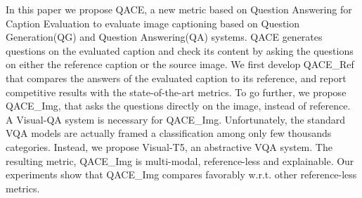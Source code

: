 In this paper we propose QACE, a new metric based on Question Answering for Caption Evaluation to evaluate image captioning based on Question Generation(QG) and Question Answering(QA) systems. QACE generates questions on the evaluated caption and check its content by asking the questions on either the reference caption or the source image. We first develop QACE\_Ref that compares the answers of the evaluated caption to its reference, and report competitive results with the state-of-the-art metrics. To go further, we propose QACE\_Img, that asks the questions directly on the image, instead of reference. A Visual-QA system is necessary for QACE\_Img. Unfortunately, the standard VQA models are actually framed a classification among only few thousands categories. Instead, we propose Visual-T5, an abstractive VQA system. The resulting metric, QACE\_Img is multi-modal, reference-less and explainable. Our experiments show that QACE\_Img compares favorably w.r.t. other reference-less metrics.

